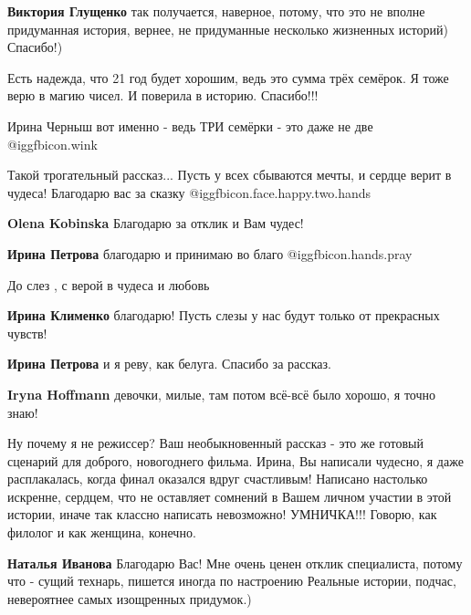\begin{itemize}
\begin{itemize} %
\textbf{Виктория Глущенко} так получается, наверное, потому, что это не вполне придуманная история, вернее, не придуманные несколько жизненных историй) Спасибо!)
\end{itemize} %


Есть надежда, что 21 год будет хорошим, ведь это сумма трёх семёрок. Я тоже
верю в магию чисел. И поверила в историю. Спасибо!!!

Ирина Черныш вот именно - ведь ТРИ семёрки - это даже не две @igg{fbicon.wink} 


Такой трогательный рассказ... Пусть у всех сбываются мечты, и сердце верит в
чудеса! Благодарю вас за сказку @igg{fbicon.face.happy.two.hands} 

\textbf{Olena Kobinska} Благодарю за отклик и Вам чудес!

\textbf{Ирина Петрова} благодарю и принимаю во благо  @igg{fbicon.hands.pray} 

До слез , с верой в чудеса и любовь

\begin{itemize} %
\textbf{Ирина Клименко} благодарю! Пусть слезы у нас будут только от прекрасных чувств!

\textbf{Ирина Петрова} и я реву, как белуга. Спасибо за рассказ.

\textbf{Iryna Hoffmann} девочки, милые, там потом всё-всё было хорошо, я точно знаю!
\end{itemize} %


Ну почему я не режиссер? Ваш необыкновенный рассказ - это же готовый сценарий
для доброго, новогоднего фильма. Ирина, Вы написали чудесно, я даже
расплакалась, когда финал оказался вдруг счастливым! Написано настолько
искренне, сердцем, что не оставляет сомнений в Вашем личном участии в этой
истории, иначе так классно написать невозможно! УМНИЧКА!!! Говорю, как филолог
и как женщина, конечно.

\begin{itemize} %
\textbf{Наталья Иванова} Благодарю Вас! Мне очень ценен отклик специалиста, потому что - сущий технарь, пишется иногда по настроению Реальные истории, подчас, невероятнее самых изощренных придумок.)


\end{itemize}
\end{itemize}
